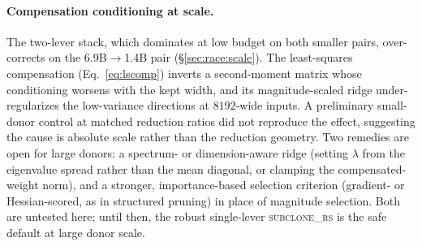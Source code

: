 \paragraph{Compensation conditioning at scale.}
The two-lever stack, which dominates at low budget on both smaller pairs,
over-corrects on the 6.9B$\to$1.4B pair (\S\ref{sec:race:scale}). The
least-squares compensation (Eq.~\ref{eq:lscomp}) inverts a second-moment matrix
whose conditioning worsens with the kept width, and its magnitude-scaled ridge
under-regularizes the low-variance directions at $8192$-wide inputs. A preliminary
small-donor control at matched reduction ratios did not reproduce the effect,
suggesting the cause is absolute scale rather than the reduction geometry. Two
remedies are open for large donors: a spectrum- or dimension-aware ridge (setting
$\lambda$ from the eigenvalue spread rather than the mean diagonal, or clamping the
compensated-weight norm), and a stronger, importance-based selection criterion
(gradient- or Hessian-scored, as in structured pruning) in place of magnitude
selection. Both are untested here; until then, the robust single-lever
\textsc{subclone\_rs} is the safe default at large donor scale.
